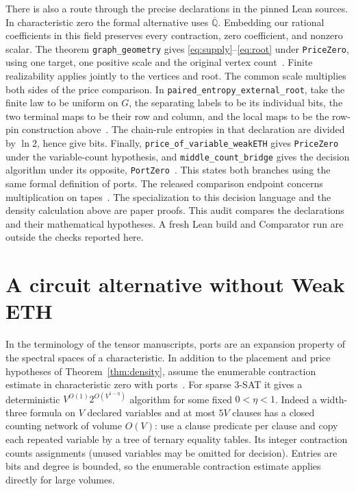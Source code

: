 \documentclass[11pt]{article}
\begin{document}
There is also a route through the precise declarations in the pinned
Lean sources. In characteristic zero the formal alternative uses
$\overline{\mathbb Q}$. Embedding our rational coefficients in this field
preserves every contraction, zero coefficient, and nonzero scalar.
The theorem \texttt{graph\_geometry} gives
\eqref{eq:supply}--\eqref{eq:root} under \texttt{PriceZero}, using one
target, one positive scale and the original vertex count~\cite{formalgeom}.
Finite realizability applies jointly to the vertices and root. The common
scale multiplies both sides of the price comparison.
In \texttt{paired\_entropy\_external\_root}, take the finite law to be
uniform on $G$, the separating labels to be its individual bits, the two
terminal maps to be their row and column, and the local maps to be
the row-pin construction above~\cite{formalent}. The chain-rule
entropies in that declaration are divided by $\ln2$, hence give bits.
Finally, \texttt{price\_of\_variable\_weakETH} gives \texttt{PriceZero}
under the variable-count hypothesis, and \texttt{middle\_count\_bridge}
gives the decision algorithm under its opposite, \texttt{PortZero}~\cite{formaleth}.
This states both branches using the same formal definition of ports.
The released comparison endpoint concerns multiplication on tapes~\cite{scope}.
The specialization to this decision language and the density calculation
above are paper proofs. This audit compares the declarations and their
mathematical hypotheses. A fresh Lean build and Comparator run are
outside the checks reported here.

\section{A circuit alternative without Weak ETH}\label{sec:cases}
In the terminology of the tensor manuscripts, ports are an expansion
property of the spectral spaces of a characteristic. In addition to
the placement and price hypotheses of Theorem~\ref{thm:density}, assume the enumerable
contraction estimate in characteristic zero with ports~\cite{expansion}.
For sparse 3-SAT it gives a deterministic $V^{O(1)}2^{O(V^{1-\eta})}$
algorithm for some fixed $0<\eta<1$. Indeed a width-three formula on
$V$ declared variables and at most $5V$ clauses has a closed counting
network of volume $O(V)$: use a clause predicate per clause and copy
each repeated variable by a tree of ternary equality tables. Its integer
contraction counts assignments (unused variables may be omitted for
decision). Entries are bits and degree is bounded, so the enumerable
contraction estimate applies directly for large volumes.
\end{document}
